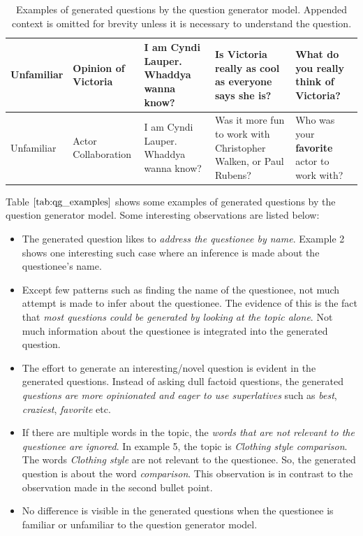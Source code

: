 \documentclass[paper=a4, fontsize=11pt]{scrartcl}
\numberwithin{equation}{section}		%
\numberwithin{figure}{section}			%
\numberwithin{table}{section}				%
\begin{document}
\begin{table}
\begin{tabular}{p{1cm}m{2.5cm}m{2.5cm}m{2.5cm}m{2.5cm}}
    \hline
   Unfamiliar & Opinion of Victoria & I am Cyndi Lauper. Whaddya wanna know? & Is Victoria really as cool as everyone says she is? & What do you really think of Victoria? \\
    \hline
   Unfamiliar & Actor Collaboration & I am Cyndi Lauper. Whaddya wanna know?  & Was it more fun to work with Christopher Walken, or Paul Rubens? & Who was your \textbf{favorite} actor to work with? \\
   \hline
   \end{tabular}
  \caption{Examples of generated questions by the question generator model. Appended context is omitted for brevity unless it is necessary to understand the question.}
  \label{tab:qg_examples}
\end{table}

Table $\ref{tab:qg_examples}$ shows some examples of generated questions by the question generator model.
Some interesting observations are listed below:
\begin{itemize}
  \item The generated question likes to \textit{address the questionee by name}. Example 2 shows one interesting such case where an inference is made about the questionee's name.
  \item Except few patterns such as finding the name of the questionee, not much attempt is made to infer about the questionee. The evidence of this is the fact that \textit{most questions could be generated by looking at the topic alone}. Not much information about the questionee is integrated into the generated question.
  \item The effort to generate an interesting/novel question is evident in the generated questions. Instead of asking dull factoid questions, the generated \textit{questions are more opinionated and eager to use superlatives} such as \textit{best}, \textit{craziest}, \textit{favorite} etc.
  \item If there are multiple words in the topic, the \textit{words that are not relevant to the questionee are ignored}. In example 5, the topic is \textit{Clothing style comparison}. The words \textit{Clothing style} are not relevant to the questionee. So, the generated question is about the word \textit{comparison}. This observation is in contrast to the observation made in the second bullet point. 
  \item No difference is visible in the generated questions when the questionee is familiar or unfamiliar to the question generator model.
  \end{itemize}
\end{document}
